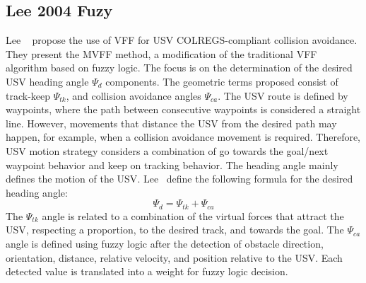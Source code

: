     \subsection{Lee 2004 Fuzy}
    Lee \etal~\cite{Lee2004Fuzzy} propose the use of \ac{VFF}\cite{Borenstein1989Real} for \ac{USV} \ac{COLREGS}-compliant collision avoidance. They present the \ac{MVFF} method, a modification of the traditional \ac{VFF} algorithm based on fuzzy logic. The focus is on the determination of the desired \ac{USV} heading angle $\Psi_d$ components. The geometric terms proposed consist of track-keep $\Psi_{tk}$, and collision avoidance angles $\Psi_{ca}$. 
    The \ac{USV} route is defined by waypoints, where the path between consecutive waypoints is considered a straight line. However, movements that distance the \ac{USV} from the desired path may happen, for example, when a collision avoidance movement is required. Therefore, \ac{USV} motion strategy considers a combination of go towards the goal/next waypoint behavior and keep on tracking behavior. The heading angle mainly defines the motion of the \ac{USV}. Lee \etal~define the following formula for the desired heading angle:
    \begin{equation}
    \Psi_d = \Psi_{tk} + \Psi_{ca}
    \end{equation}
    The $\Psi_{tk}$ angle is related to a combination of the virtual forces that attract the \ac{USV}, respecting a proportion, to the desired track, and towards the goal. The $\Psi_{ca}$ angle is defined using fuzzy logic after the detection of obstacle direction, orientation, distance, relative velocity, and position relative to the \ac{USV}. Each detected value is translated into a weight for fuzzy logic decision. 
    
